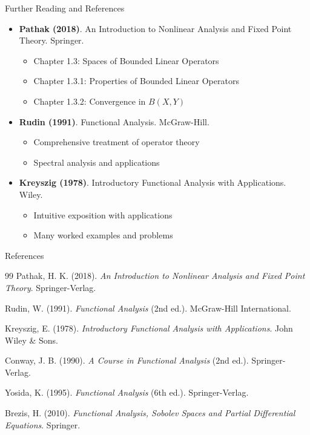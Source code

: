 \documentclass[aspectratio=169,10pt]{beamer}
\begin{document}
\begin{frame}{Further Reading and References}
    \begin{itemize}
        \item \textbf{Pathak (2018)}. An Introduction to Nonlinear Analysis and Fixed Point Theory. Springer.
        \begin{itemize}
            \item Chapter 1.3: Spaces of Bounded Linear Operators
            \item Chapter 1.3.1: Properties of Bounded Linear Operators
            \item Chapter 1.3.2: Convergence in $B(X,Y)$
        \end{itemize}

        \vspace{0.3cm}

        \item \textbf{Rudin (1991)}. Functional Analysis. McGraw-Hill.
        \begin{itemize}
            \item Comprehensive treatment of operator theory
            \item Spectral analysis and applications
        \end{itemize}

        \vspace{0.3cm}

        \item \textbf{Kreyszig (1978)}. Introductory Functional Analysis with Applications. Wiley.
        \begin{itemize}
            \item Intuitive exposition with applications
            \item Many worked examples and problems
        \end{itemize}
    \end{itemize}
\end{frame}

\begin{frame}[allowframebreaks]{References}
    \tiny
    \begin{thebibliography}{99}
         Pathak, H. K. (2018). \textit{An Introduction to Nonlinear Analysis and Fixed Point Theory}. Springer-Verlag.

         Rudin, W. (1991). \textit{Functional Analysis} (2nd ed.). McGraw-Hill International.

         Kreyszig, E. (1978). \textit{Introductory Functional Analysis with Applications}. John Wiley \& Sons.

         Conway, J. B. (1990). \textit{A Course in Functional Analysis} (2nd ed.). Springer-Verlag.

         Yosida, K. (1995). \textit{Functional Analysis} (6th ed.). Springer-Verlag.

         Brezis, H. (2010). \textit{Functional Analysis, Sobolev Spaces and Partial Differential Equations}. Springer.
    \end{thebibliography}
\end{frame}
\end{document}
